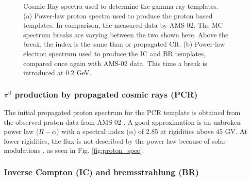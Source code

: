 \begin{figure}[h]
\begin{minipage}[h]{0.45\textwidth}
	  \subcaption{}
	  \label{fig:electron_spec}
  \end{minipage}
  \caption[Initial CR spectra.]{Cosmic Ray spectra used to determine the gamma-ray templates. (a) Power-law proton spectra used to produce the proton based templates. In comparison, the measured data by AMS-02. The MC spectrum breaks are varying between the two shown here. Above the break, the index is the same than or propagated CR. (b) Power-law electron spectrum used to produce the IC and BR templates, compared once again with AMS-02 data. This time a break is introduced at 0.2 GeV.}
  \label{fig:cosmic_ray_spec}
\end{figure}


\subsubsection{$\pi^0$ production by propagated cosmic rays (PCR)}

The initial propagated proton spectrum for the PCR template is obtained from the observed proton data from AMS-02 \cite{Aguilar15}. A good approximation is an unbroken power law ($R-\alpha$) with a spectral index ($\alpha$) of 2.85 at rigidities above 45 GV. At lower rigidities, the flux is not described by the power law because of solar modulations \cite{Gleeson68}, as seen in Fig. \ref{fig:proton_spec}. %



\subsubsection{Inverse Compton (IC) and bremsstrahlung (BR)}

